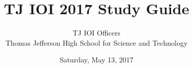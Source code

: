 \title{{\LARGE TJ IOI 2017 Study Guide}}

\author
{
	{
		\large
		TJ IOI Officers \\
		\vspace{0.5em}
		Thomas Jefferson High School for Science and Technology
	}
}
\date{{\large Saturday, May 13, 2017}}

\maketitle
